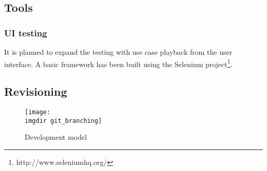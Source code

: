 \subsection{Tools}


\subsubsection{UI testing}
It is planned to expand the testing with use case playback from the user interface. A basic framework has been built using the Selenium project\footnote{http://www.seleniumhq.org/}.

\subsection{Revisioning}
\begin{figure}[ht]
\centering
\texttt{[image: \\imgdir git\_branching]}
\caption{Development model}
\label{fig:git_branching}
\end{figure}



